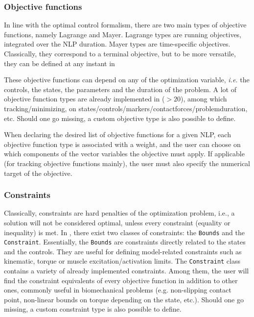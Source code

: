 \subsubsection{Objective functions}
In line with the optimal control formalism, there are two main types of objective functions, namely Lagrange and Mayer. 
Lagrange types are running objectives, integrated over the NLP duration. Mayer types are time-specific objectives. 
Classically, they correspond to a terminal objective, but to be more versatile, they can be defined at any instant in \bioptim{}

These objective functions can depend on any of the optimization variable, \textit{i.e.} the controls, the states, the parameters and the duration of the problem. 
A lot of objective function types are already implemented in \bioptim ($>\!20$), among which tracking\:/\:minimizing, on states\:/\:controls\:/\:markers\:/\:contact\:forces\:/\:problem\:duration, etc. 
Should one go missing, a custom objective type is also possible to define.

When declaring the desired list of objective functions for a given NLP, each objective function type is associated with a weight, and the user can choose on which components of the vector variables the objective must apply. 
If applicable (for tracking objective functions mainly), the user must also specify the numerical target of the objective.

\subsubsection{Constraints}
Classically, constraints are hard penalties of the optimization problem, i.e., a solution will not be considered optimal, unless every constraint (equality or inequality) is met.
In \bioptim, there exist two classes of constraints: the \texttt{Bounds} and the \texttt{Constraint}.
Essentially, the \texttt{Bounds} are constraints directly related to the states and the controls.
They are useful for defining model-related constraints such as kinematic, torque or muscle excitation\:/\:activation limits. 
The \texttt{Constraint} class contains a variety of already implemented constraints.
Among them, the user will find the constraint equivalents of every objective function in addition to  other ones, commonly useful in biomechanical problems (e.g. non-slipping contact point, non-linear bounds on torque depending on the state, etc.).
Should one go missing, a custom constraint type is also possible to define.